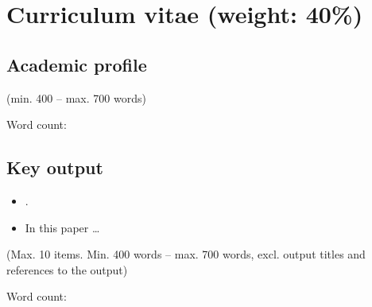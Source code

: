 \section{Curriculum vitae (weight: 40\%)}\label{sec:cv}

\newrefcontext[labelprefix={ko},sorting=ydnt]

\subsection{Academic profile}\label{sec:profile}

\vspace{\baselineskip}
(min. 400 -- max. 700 words)

\vspace{\baselineskip}
Word count:


\subsection{Key output}

\noprintbibliography

\begin{itemize}
    \setlength\itemsep{6pt}
    \item[\cite{clarke2018}] .
    \item[] In this paper \ldots
\end{itemize}

\vspace{\baselineskip}
(Max. 10 items. Min. 400 words -- max. 700 words, excl. output titles and references to the output)

\vspace{\baselineskip}
Word count:
